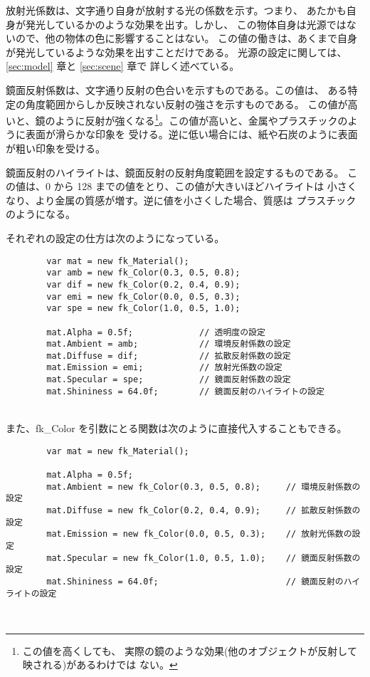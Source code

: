 放射光係数は、文字通り自身が放射する光の係数を示す。つまり、
あたかも自身が発光しているかのような効果を出す。しかし、
この物体自身は光源ではないので、他の物体の色に影響することはない。
この値の働きは、あくまで自身が発光しているような効果を出すことだけである。
光源の設定に関しては、\ref{sec:model} 章と \ref{sec:scene} 章で
詳しく述べている。

鏡面反射係数は、文字通り反射の色合いを示すものである。この値は、
ある特定の角度範囲からしか反映されない反射の強さを示すものである。
この値が高いと、鏡のように反射が強くなる\footnote{この値を高くしても、
実際の鏡のような効果(他のオブジェクトが反射して映される)があるわけでは
ない。}。この値が高いと、金属やプラスチックのように表面が滑らかな印象を
受ける。逆に低い場合には、紙や石炭のように表面が粗い印象を受ける。

鏡面反射のハイライトは、鏡面反射の反射角度範囲を設定するものである。
この値は、0 から 128 までの値をとり、この値が大きいほどハイライトは
小さくなり、より金属の質感が増す。逆に値を小さくした場合、質感は
プラスチックのようになる。

それぞれの設定の仕方は次のようになっている。
\\
\begin{breakbox}
\begin{verbatim}
        var mat = new fk_Material();
        var amb = new fk_Color(0.3, 0.5, 0.8);
        var dif = new fk_Color(0.2, 0.4, 0.9);
        var emi = new fk_Color(0.0, 0.5, 0.3);
        var spe = new fk_Color(1.0, 0.5, 1.0);

        mat.Alpha = 0.5f;             // 透明度の設定
        mat.Ambient = amb;            // 環境反射係数の設定
        mat.Diffuse = dif;            // 拡散反射係数の設定
        mat.Emission = emi;           // 放射光係数の設定
        mat.Specular = spe;           // 鏡面反射係数の設定
        mat.Shininess = 64.0f;        // 鏡面反射のハイライトの設定
\end{verbatim}
\end{breakbox}
~ \\
また、fk\_Color を引数にとる関数は次のように直接代入することもできる。
\\
\begin{breakbox}
\begin{verbatim}
        var mat = new fk_Material();

        mat.Alpha = 0.5f;
        mat.Ambient = new fk_Color(0.3, 0.5, 0.8);     // 環境反射係数の設定
        mat.Diffuse = new fk_Color(0.2, 0.4, 0.9);     // 拡散反射係数の設定
        mat.Emission = new fk_Color(0.0, 0.5, 0.3);    // 放射光係数の設定
        mat.Specular = new fk_Color(1.0, 0.5, 1.0);    // 鏡面反射係数の設定
        mat.Shininess = 64.0f;                         // 鏡面反射のハイライトの設定
\end{verbatim}
\end{breakbox}
~

